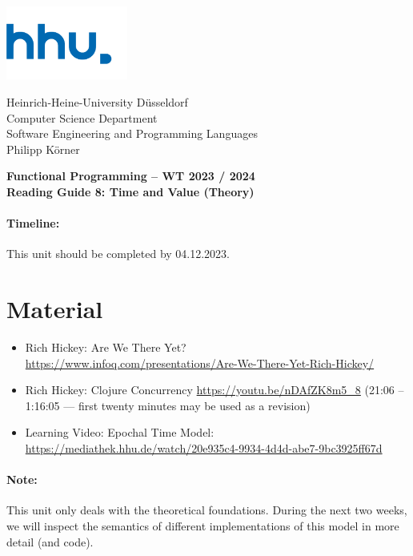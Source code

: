 \documentclass[11pt,a4paper]{article}
\begin{document}
	
\begin{minipage}[b]{\textwidth}
	\parbox[t]{5cm}{%
		\includegraphics[width=4cm]{unilogo}
		\hfill
	}
	\parbox[b]{11cm}{%
		Heinrich-Heine-University D\"usseldorf\\
		Computer Science Department\\
		Software Engineering and Programming Languages\\
		Philipp K\"orner
	}
\end{minipage}
\begin{center}
	\bf
	Functional Programming -- WT 2023 / 2024\\
	Reading Guide 8: Time and Value (Theory)
\end{center}

\pagestyle{empty}

\paragraph{Timeline:} This unit should be completed by 04.12.2023.

\section{Material} 

\begin{itemize}
\item Rich Hickey: Are We There Yet? \\ \url{https://www.infoq.com/presentations/Are-We-There-Yet-Rich-Hickey/}
\item Rich Hickey: Clojure Concurrency \url{https://youtu.be/nDAfZK8m5_8} (21:06 -- 1:16:05 --- first twenty minutes may be used as a revision)
\item Learning Video: Epochal Time Model: \url{https://mediathek.hhu.de/watch/20e935c4-9934-4d4d-abe7-9bc3925ff67d}
\end{itemize}

\paragraph{Note:} This unit only deals with the theoretical foundations.
During the next two weeks, we will inspect the semantics of different implementations of this model
in more detail (and code).
\end{document}
